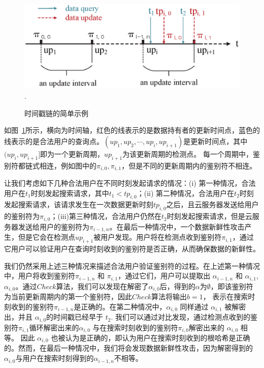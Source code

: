 \begin{figure}[htb]
  \centering
  \includegraphics[width=5 in]{fig/timestamp}
  \DeclareGraphicsExtensions.
  \caption{时间戳链的简单示例}
  \label{fig:timestamp}
\end{figure}

如图~\ref{fig:timestamp}所示，横向为时间轴，红色的线表示的是数据持有者的更新时间点，蓝色的线表示的是合法用户的查询点。$(up_1,up_2,\cdots,up_i,up_{i+1})$是更新时间点，其中$(up_i,up_{i+1}]$即为一个更新周期，$up_{i+1}$为该更新周期的检测点。
每一个周期中，鉴别符都链式相连，例如图中的$\pi_{i, 0}, \pi_{i, 1}$，但是不同的更新周期内的鉴别符不相连。

让我们考虑如下几种合法用户在不同时刻发起请求的情况：(i) 第一种情况，合法用户在$t_1$时刻发起搜索请求，其中$t_1 < tp_{i, 0}$；(ii) 第二种情况，合法用户在$t_2$时刻发起搜索请求，该请求发生在一次数据更新时刻$tp_{i, 0}$之后，且云服务器发送给用户的鉴别符为$\pi_{i, 0}$；(iii)第三种情况，合法用户仍然在$t_2$时刻发起搜索请求，但是云服务器发送给用户的鉴别符为$\pi_{i-1, n}$。在最后一种情况中，一个数据新鲜性攻击产生，但是它会在检测点$up_{i+1}$被用户发现。用户将在检测点收到鉴别符$\pi_{i, 1}$，通过它用户可以验证用户在查询时刻收到的鉴别符是否正确，从而确保数据的新鲜性。

我们仍然采用上述三种情况来描述合法用户验证鉴别符的过程。在上述第一种情况中，用户将收到鉴别符$\pi_{i-1, n}$ 和 $\pi_{i, 1}$，通过它们，用户可以提取出 $\alpha_{i-1,n}$ 和 $\alpha_{i,1}$,$\alpha_{i,0}$。通过$Check$算法，我们可以发现在解密了$\alpha_{i, 0}$后，得到的$\alpha$为$\emptyset$，即该鉴别符为当前更新周期内的第一个鉴别符，因此$Check$算法将输出$b=1$， 表示在搜索时刻收到的鉴别符$\pi_{i-1, n}$是正确的。在第二种情况中，$\alpha_{i, 0}$ 同样通过 $\alpha_{i, 1}$ 被解密出，并且 $\alpha_{i, 0}$的时间戳已经早于 $t_2$. 我们可以通过对比发现，通过检测点收到的鉴别符$\pi_{i, 1}$循环解密出来的$\alpha_{i, 0}$ 与在搜索时刻收到的鉴别符$\pi_{i, 0}$解密出来的 $\alpha_{i,0}$ 相等。 因此 $\alpha_{i,0}$ 也被认为是正确的，即认为用户在搜索时刻收到的根哈希是正确的。然而，在最后一种情况中，我们将会发现数据新鲜性攻击，因为解密得到的$\alpha_{i, 0}$与用户在搜索时刻得到的$\alpha_{i-1, n}$不相等。

